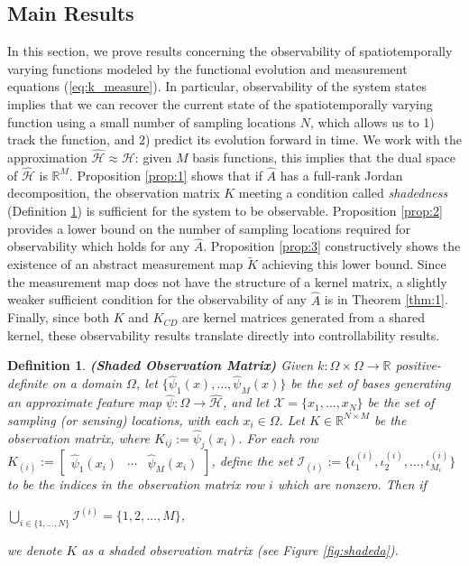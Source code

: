 \documentclass[letterpaper,12pt,peerreviewca,draftcls]{IEEEtran}
\newtheorem{definition}{Definition}
\newcommand{\R}{\mathbb{R}}
\newcommand{\fspace}{\mathcal{H}}
\newcommand{\fmap}{\psi}
\newcommand{\centers}{C}
\newcommand{\centerscontrol}{D}
\newcommand{\kernel}{k}
\newcommand{\empK}{\ensuremath{K}}
\newcommand{\dom}{\Omega}
\newcommand{\sampSet}{\mathcal{X}}
\newcommand{\sampSetLong}{\{x_1, \dots, x_{\nsamp}\}}
\newcommand{\nsamp}{N}
\newcommand{\ncent}{M}
\renewcommand{\eqref}[1]{(\ref{eq:#1})}
\newcommand{\Ind}{\mathcal{I}}
\newcommand{\fspaceApprox}{\widehat{\fspace}}
\newcommand{\fmapApprox}{\widehat{\fmap}}
\newcommand{\obsMat}{\empK}
\newcommand{\empKCD}{\empK_{\centers\centerscontrol}}
\newcommand{\measmap}{\widetilde{\empK}}
\newcommand{\dualop}{A}
\newcommand{\dualopApprox}{\widehat{\dualop}}
\begin{document}
\subsection{Main Results}\label{sec:theory_results}

In this section, we prove results concerning the observability of spatiotemporally varying functions modeled by the functional evolution and measurement equations \eqref{k_measure}. In particular,  observability of the system states implies that we can recover the current state of the spatiotemporally varying function using a small number of sampling locations $\nsamp$, which allows us to 1) track the function, and 2) predict its evolution forward in time. We work with the approximation $\fspaceApprox\approx\fspace$: given $\ncent$ basis functions, this implies that the dual space of $\fspaceApprox$ is $\R^{\ncent}$.
Proposition \ref{prop:1} shows that if $\dualopApprox$ has a full-rank Jordan decomposition, the observation matrix $\obsMat$ meeting a condition called \emph{shadedness} (Definition \ref{def:shaded}) is sufficient for the system to be observable. Proposition \ref{prop:2} provides a lower bound on the number of sampling locations required for observability which holds for any $\dualopApprox$.  Proposition \ref{prop:3} constructively shows the existence of an abstract measurement map $\measmap$ achieving this lower bound. Since the measurement map does not have the structure of a kernel matrix, a slightly weaker sufficient condition for the observability of any $\dualopApprox$ is in Theorem \ref{thm:1}. Finally, since both $\empK$ and $\empKCD$ are kernel matrices generated from a shared kernel, these observability results translate directly into controllability results.

\begin{definition}\label{def:shaded}
\textbf{(Shaded Observation Matrix)} Given $\kernel:\dom\times\dom\to\R$ positive-definite on a domain $\dom$, let $\{\fmapApprox_1(x), \dots, \fmapApprox_{\ncent}(x)\}$ be the set of bases generating an approximate feature map $\fmapApprox:\dom\to\fspaceApprox$, and let
$\sampSet = \sampSetLong$ be the set of sampling (or sensing) locations, with each $x_i\in\dom$. 
Let $\obsMat\in\R^{\nsamp\times\ncent}$ be the observation matrix, where $ \obsMat_{ij} := \fmapApprox_j(x_i)$. For each
row $\obsMat_{(i)} := \left[\begin{smallmatrix}
  \fmapApprox_1(x_i) & \cdots & \fmapApprox_{\ncent}(x_i)
 \end{smallmatrix}\right]$, define the set 
$\Ind_{(i)} := \{\iota_1^{(i)},\iota_2^{(i)},\dots, \iota_{\ncent_i}^{(i)}\}$ to be the indices in the observation
matrix row $i$ which are nonzero. 
Then if 

$\bigcup_{i\in\{1,\dots,\nsamp\}} \Ind^{(i)} = \{1,2,\dots, \ncent\}$,

we denote $\obsMat$ as a \emph{shaded observation matrix} (see Figure \ref{fig:shadeda}).
\end{definition}
\end{document}
